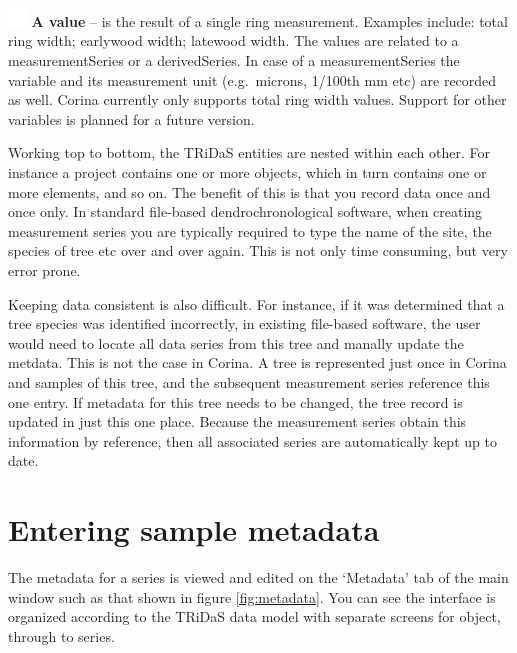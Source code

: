 \begin{description}
\item \includegraphics[width=5mm]{Images/pixel.png} \textbf{A value} --  is the result of a single ring measurement. Examples include: total ring width; earlywood width; latewood width. The values are related to a measurementSeries or a derivedSeries. In case of a measurementSeries the variable and its measurement unit (e.g.\ microns, 1/100th mm etc) are recorded as well.  Corina currently only supports total ring width values.  Support for other variables is planned for a future version.

\end{description}


Working top to bottom, the TRiDaS entities are nested within each other.  For instance a project contains one or more objects, which in turn contains one or more elements, and so on.  The benefit of this is that you record data once and once only.  In standard file-based dendrochronological software, when creating measurement series you are typically required to type the name of the site, the species of tree etc over and over again.  This is not only time consuming, but very error prone.  

Keeping data consistent is also difficult.  For instance, if it was determined that a tree species was identified incorrectly, in existing file-based software, the user would need to locate all data series from this tree and manally update the metdata.  This is not the case in Corina.  A tree is represented just once in Corina and samples of this tree, and the subsequent measurement series reference this one entry.  If metadata for this tree needs to be changed, the tree record is updated in just this one place.  Because the measurement series obtain this information by reference, then all associated series are automatically kept up to date.

\section{Entering sample metadata}
The metadata for a series is viewed and edited on the `Metadata' tab of the main window such as that shown in figure \ref{fig:metadata}.  You can see the interface is organized according to the TRiDaS data model with separate screens for object, through to series.  


